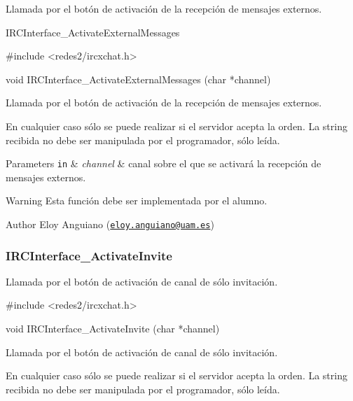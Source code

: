  Llamada por el botón de activación de la recepción de mensajes externos.

I\+R\+C\+Interface\+\_\+\+Activate\+External\+Messages


\begin{DoxyCode}
\textcolor{preprocessor}{#include <redes2/ircxchat.h>}

\textcolor{keywordtype}{void} IRCInterface\_ActivateExternalMessages (\textcolor{keywordtype}{char} *channel)
\end{DoxyCode}


Llamada por el botón de activación de la recepción de mensajes externos.

En cualquier caso sólo se puede realizar si el servidor acepta la orden. La string recibida no debe ser manipulada por el programador, sólo leída.


\begin{DoxyParams}[1]{Parameters}
\mbox{\tt in}  & {\em channel} & canal sobre el que se activará la recepción de mensajes externos.\\
\hline
\end{DoxyParams}
\begin{DoxyWarning}{Warning}
Esta función debe ser implementada por el alumno.
\end{DoxyWarning}
\begin{DoxyAuthor}{Author}
Eloy Anguiano (\href{mailto:eloy.anguiano@uam.es}{\tt eloy.\+anguiano@uam.\+es})
\end{DoxyAuthor}


 \hypertarget{IRCInterface_ActivateInvite}{}\subsubsection{I\+R\+C\+Interface\+\_\+\+Activate\+Invite}\label{IRCInterface_ActivateInvite}
Llamada por el botón de activación de canal de sólo invitación.


\begin{DoxyCode}
\textcolor{preprocessor}{#include <redes2/ircxchat.h>}

\textcolor{keywordtype}{void} IRCInterface\_ActivateInvite (\textcolor{keywordtype}{char} *channel)
\end{DoxyCode}


Llamada por el botón de activación de canal de sólo invitación.

En cualquier caso sólo se puede realizar si el servidor acepta la orden. La string recibida no debe ser manipulada por el programador, sólo leída.


